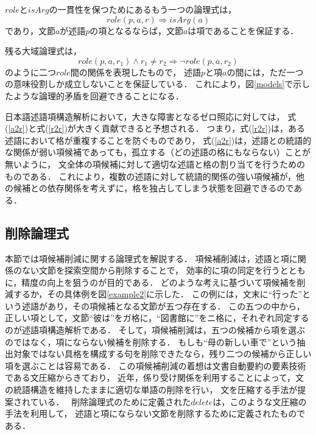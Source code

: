\documentclass[japanese]{jnlp_1.4}
\begin{document}
$\mathit{role}$と$\mathit{isArg}$の一貫性を保つためにあるもう一つの論理式は，
\begin{equation}
\mathit{role}(p,a,r) \Rightarrow \mathit{isArg}\left(a\right) \label{r2a}
\end{equation}
であり，文節$a$が述語$p$の項となるならば，文節$a$は項であることを保証する．

残る大域論理式は，
\begin{equation}
\mathit{role}(p,a,r_1) \wedge r_1 \neq r_2 \Rightarrow \neg \mathit{role}(p,a,r_2) \label{r2r}
\end{equation}
のように二つ$\mathit{role}$間の関係を表現したもので，
述語$p$と項$a$の間には，ただ一つの意味役割しか成立しないことを保証している．
これにより，図\ref{models}で示したような論理的矛盾を回避できることになる．

日本語述語項構造解析において，大きな障害となるゼロ照応に対しては，
式(\ref{a2r})と式(\ref{r2r})が大きく貢献できると予想される．
つまり，式(\ref{r2r})は，ある述語において格が重複することを防ぐものであり，
式(\ref{a2r})は，述語との統語的な関係が弱い項候補であっても，孤立する（どの述語の格にもならない）ことが無いように，
文全体の項候補に対して適切な述語と格の割り当てを行うためのものである．
これにより，複数の述語に対して統語的関係の強い項候補が，他の候補との依存関係を考えずに，格を独占してしまう状態を回避できるのである．


\subsection{削除論理式}
\label{deletion}

本節では項候補削減に関する論理式を解説する．
項候補削減は，述語と項に関係のない文節を探索空間から削除することで，
効率的に項の同定を行うとともに，精度の向上を狙うのが目的である．
どのような考えに基づいて項候補を削減するか，その具体例を図\ref{example2}に示した．
この例には，文末に``行った''という述語があり，その項候補となる文節が五つ存在する．
この五つの中から，正しい項として，文節``彼は''をガ格に，``図書館に''をニ格に，それぞれ同定するのが述語項構造解析である．
そして，項候補削減は，五つの候補から項を選ぶのではなく，項にならない候補を削除する．
もしも``母の新しい車で''という抽出対象ではない具格を構成する句を削除できたなら，残り二つの候補から正しい項を選ぶことは容易である．
この項候補削減の着想は文書自動要約の要素技術である文圧縮からきており，
近年，係り受け関係を利用することによって，文の統語構造を維持したままに適切な単語の削除を行い，
文を圧縮する手法が提案されている．~\cite{clarke:2008:jair,huang:2012:aaai}
削除論理式のために定義された$\mathit{delete}$は，このような文圧縮の手法を利用して，
述語と項にならない文節を削除するために定義されたものである．
\end{document}
